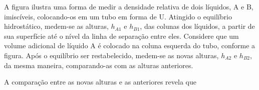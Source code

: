A figura ilustra uma forma de medir a densidade relativa de dois líquidos, A e B, imiscíveis, colocando-os em um tubo em forma de U. Atingido o equilíbrio hidrostático, medem-se as alturas, $h_{A1}$ e $h_{B1}$, das colunas dos líquidos, a partir de sua superfície até o nível da linha de separação entre eles. Considere que um volume adicional de líquido A é colocado na coluna esquerda do tubo, conforme a figura. Após o equilíbrio ser restabelecido, medem-se as novas alturas, $h_{A2}$ e $h_{B2}$, da mesma maneira, comparando-as com as alturas anteriores.\par
{}
A comparação entre as novas alturas e as anteriores revela que\par
\begin{altlinha}
%
%
\\[1.5pt]
%
\end{altlinha}
